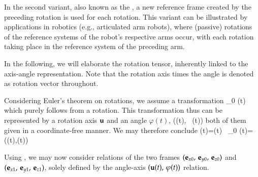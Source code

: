 {In the second variant, also known as the , a new reference frame created by the preceding rotation is used for each rotation. This variant can be illustrated by applications in robotics (e.g., articulated arm robots), where (passive) rotations of the reference systems of the robot's respective arms occur, with each rotation taking place in the reference system of the preceding arm.


In the following, we will elaborate the rotation tensor, inherently linked to the axis-angle representation.
Note that the rotation axis times the angle is denoted as rotation vector throughout.

Considering Euler's theorem on rotations, we assume a transformation
\be
  \rv_0 \ra \rv(t)
\ee
which purely follows from a rotation. This transformation thus can be represented by a rotation axis $\mathbf{u}$ and an angle $\varphi(t)$,
\be
  (\uv(t), \, \varphi(t))
\ee
both of them given in a coordinate-free manner.
We may therefore conclude
\be %
  \rv(t)=\Rot(t) \, \rv_0 \qquad {} \qquad \Rot(t)=\Rot(\uv(t),\varphi(t))
\ee
%
%

Using , we may now consider relations of the two frames $(\mathbf{e}_{x0},\,\mathbf{e}_{y0},\,\mathbf{e}_{z0})$ and $(\mathbf{e}_{x1},\,\mathbf{e}_{y1},\,\mathbf{e}_{z1})$, solely defined by the angle-axis $(\mathbf{u}(t), \, \varphi(t))$ relation.
%
%

}
